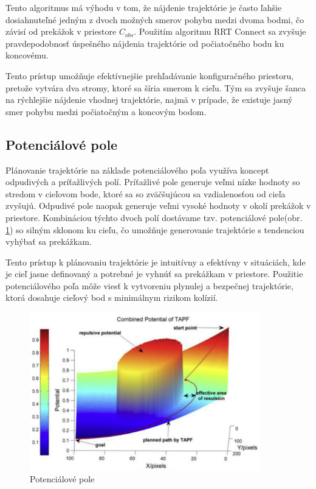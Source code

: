 Tento algoritmus má výhodu v tom, že nájdenie trajektórie je často ľahšie dosiahnuteľné jedným z dvoch možných smerov pohybu medzi dvoma bodmi, čo závisí od prekážok v priestore $C_{obs}$. Použitím algoritmu RRT Connect sa zvyšuje pravdepodobnosť úspešného nájdenia trajektórie od počiatočného bodu ku koncovému.

Tento prístup umožňuje efektívnejšie prehľadávanie konfiguračného priestoru, pretože vytvára dva stromy, ktoré sa šíria smerom k cieľu. Tým sa zvyšuje šanca na rýchlejšie nájdenie vhodnej trajektórie, najmä v prípade, že existuje jasný smer pohybu medzi počiatočným a koncovým bodom.



\subsection{Potenciálové pole}
\label{kap:2.4}

Plánovanie trajektórie na základe potenciálového poľa využíva koncept odpudivých a príťažlivých polí. Príťažlivé pole generuje veľmi nízke hodnoty so stredom v cieľovom bode, ktoré sa so zväčšujúcou sa vzdialenosťou od cieľa zvyšujú. Odpudivé pole naopak generuje veľmi vysoké hodnoty v okolí prekážok v priestore. Kombináciou týchto dvoch polí dostávame tzv. potenciálové pole(obr. \ref{OBRAZOK 1.2.4}) so silným sklonom ku cieľu, čo umožňuje generovanie trajektórie s tendenciou vyhýbať sa prekážkam.

Tento prístup k plánovaniu trajektórie je intuitívny a efektívny v situáciách, kde je cieľ jasne definovaný a potrebné je vyhnúť sa prekážkam v priestore. Použitie potenciálového poľa môže viesť k vytvoreniu plynulej a bezpečnej trajektórie, ktorá dosahuje cieľový bod s minimálnym rizikom kolízií.

\begin{figure}[h]
	\centering
	\includegraphics[width=100mm]{img/Potencialove_pole2.png}
	\caption{Potenciálové pole \cite{}}\label{OBRAZOK 1.2.4} 
\end{figure} 

